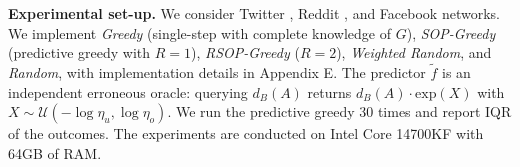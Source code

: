 \textbf{Experimental set-up.} We consider Twitter \cite{facebook&twitter}, Reddit \cite{reddit}, and Facebook \cite{facebook2} networks. We implement \textit{Greedy} (single-step with complete knowledge of $G$), \textit{SOP-Greedy} (predictive greedy with $R=1$), \textit{RSOP-Greedy} ($R=2$), \textit{Weighted Random}, and \textit{Random}, with implementation details in Appendix E. %
The predictor $\tilde{f}$ is an independent erroneous oracle: querying $d_B(A)$ returns $d_B(A) \cdot \text{exp}(X)$ with $X \sim \mathcal{U}(-\log \eta_u, \log \eta_o)$. We run the predictive greedy 30 times and report IQR of the outcomes. The experiments are conducted on Intel Core 14700KF with 64GB of RAM. 






